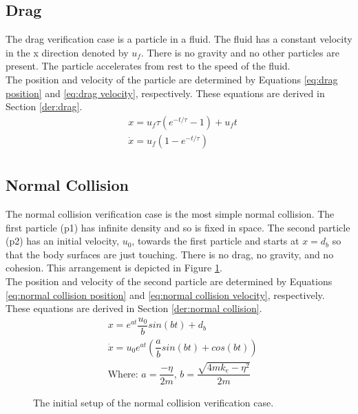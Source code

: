 \documentclass[a4paper,11pt,titlepage]{report}
\begin{document}
\subsection{Drag}
\label{sec:drag verification}
The drag verification case is a particle in a fluid. The fluid has a constant velocity in the x direction denoted by $u_f$. There is no gravity and no other particles are present. The particle accelerates from rest to the speed of the fluid.
\\The position and velocity of the particle are determined by Equations \ref{eq:drag position} and \ref{eq:drag velocity}, respectively. These equations are derived in Section \ref{der:drag}.
\begin{align}
&x = u_f \tau (e^{-t/\tau} - 1) + u_f t \label{eq:drag position} \\
&\dot{x} = u_f (1 - e^{-t/\tau}) \label{eq:drag velocity} \\
\end{align}
\subsection{Normal Collision}
\label{sec:normal collision verification}
The normal collision verification case is the most simple normal collision. The first particle (p1) has infinite density and so is fixed in space. The second particle (p2) has an initial velocity, $u_0$, towards the first particle and starts at $x = d_b$ so that the body surfaces are just touching. There is no drag, no gravity, and no cohesion. This arrangement is depicted in Figure \ref{fig:normal collision}.
\\The position and velocity of the second particle are determined by Equations \ref{eq:normal collision position} and \ref{eq:normal collision velocity}, respectively. These equations are derived in Section \ref{der:normal collision}.
\begin{align}
&x = e^{at} \dfrac{u_0}{b} sin(bt) + d_b \label{eq:normal collision position} \\
&\dot{x} = u_0 e^{at} (\dfrac{a}{b} sin(bt) + cos(bt)) \label{eq:normal collision velocity} \\
&\text{Where: } a = \dfrac{-\eta}{2m} \text{,    } b = \dfrac{\sqrt{4mk_e - \eta ^ 2}}{2m} \nonumber
\end{align}
\begin{figure}[!ht]
\centering

\caption{The initial setup of the normal collision verification case.}
\label{fig:normal collision}
\end{figure}
\end{document}
